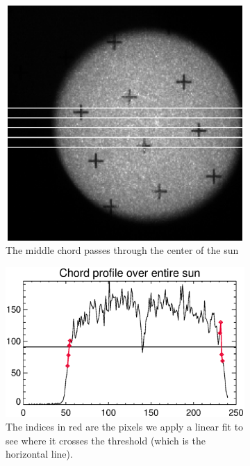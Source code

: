\documentclass[10pt]{scrartcl}
\begin{document}
\begin{figure}[!ht]
    \centering
    \hspace{-1.0in}
    \begin{subfigure}[b]{.45\linewidth}
        \centering
        \includegraphics[width=1.3\textwidth]{../plots_tables_images/5chords.eps}
        \caption{The middle chord passes through the center of the sun}
        \label{chords}
    \end{subfigure}
    \hspace{.5in}
    \begin{subfigure}[b]{.45\linewidth}
        \centering
        \includegraphics[width=1.3\textwidth]{../plots_tables_images/redlimbs.eps}
        \caption{The indices in red are the pixels we apply a linear fit to see where it crosses the threshold (which is the horizontal line).}
        \label{limbs}
    \end{subfigure}
    \caption{}
    \label{sup}
\end{figure}
\end{document}
